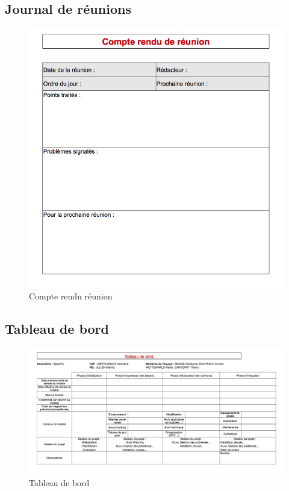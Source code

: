 \subsection{Journal de réunions}
\begin{figure}[h]
    \centering
    \includegraphics[width=140mm]{images/compte_rendu_reunion.png}
    \caption{Compte rendu réunion}
\end{figure}

\pagebreak
\begin{landscape}
\subsection{Tableau de bord}
\begin{figure}[h]
    \centering
    \includegraphics[width=220mm]{images/dashboard.png}
    \caption{Tableau de bord}
\end{figure}
\end{landscape}
